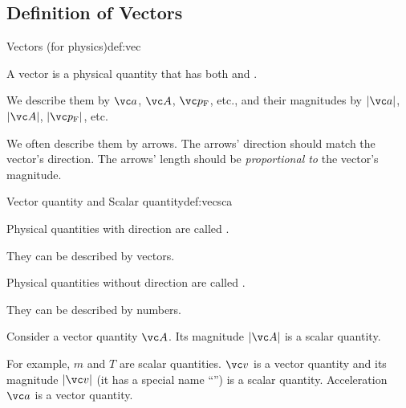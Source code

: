 \documentclass[11pt,pdfa,lastpage]{MishoNote}
\begin{document}
\subsection{Definition of Vectors}
\begin{definition}{Vectors (for physics)}{def:vec}
\begin{miniitemize}
  \item A vector is a physical quantity that has both  and .
  \item We describe them by $\vc a$, $\vc A$, $\vc p\w F$, etc.,
    and their magnitudes by $|\vc a|$, $|\vc A|$, $|\vc p\w F|$, etc.
  \item We often describe them by arrows. The arrows' direction should match the vector's direction. The arrows' length should be \emph{proportional to} the vector's magnitude.
\end{miniitemize}
\end{definition}
\OutputNote

\begin{definition}{Vector quantity and Scalar quantity}{def:vecsca}
  \begin{miniitemize}
    \item Physical quantities with direction are called .
    \begin{miniitemize} \item They can be described by vectors. \end{miniitemize}
    \item Physical quantities without direction are called .
    \begin{miniitemize} \item They can be described by numbers.\end{miniitemize}
    \item Consider a vector quantity $\vc A$. Its magnitude $|\vc A|$ is a scalar quantity.
  \end{miniitemize}
  \end{definition}
\OutputNote
For example,  $m$ and  $T$ are scalar quantities.  $\vc v$ is a vector quantity and its magnitude $|\vc v|$ (it has a special name ``'')  is a scalar quantity. Acceleration $\vc a$ is a vector quantity.
\end{document}
